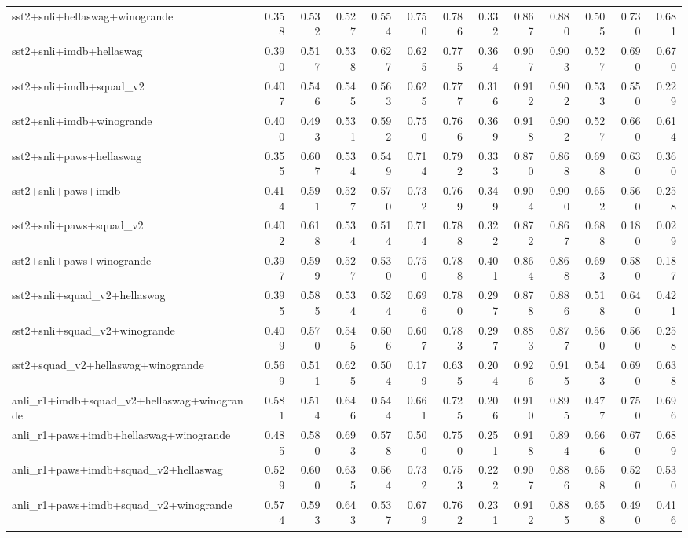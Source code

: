 \begin{table}[t]
\begin{tabular}{lrrrrrrrrrrrr}
    sst2+snli+hellaswag+winogrande & 0.358 & 0.532 & 0.527 & 0.554 & 0.750 & 0.786 & 0.332 & 0.867 & 0.880 & 0.505 & 0.730 & 0.681 \\
    sst2+snli+imdb+hellaswag & 0.390 & 0.517 & 0.538 & 0.627 & 0.625 & 0.775 & 0.364 & 0.907 & 0.903 & 0.527 & 0.690 & 0.670 \\
    sst2+snli+imdb+squad\_v2 & 0.407 & 0.546 & 0.545 & 0.563 & 0.625 & 0.777 & 0.316 & 0.912 & 0.902 & 0.533 & 0.550 & 0.229 \\
    sst2+snli+imdb+winogrande & 0.400 & 0.493 & 0.531 & 0.592 & 0.750 & 0.766 & 0.369 & 0.918 & 0.902 & 0.527 & 0.660 & 0.614 \\
    sst2+snli+paws+hellaswag & 0.355 & 0.607 & 0.534 & 0.549 & 0.714 & 0.792 & 0.333 & 0.870 & 0.868 & 0.698 & 0.630 & 0.360 \\
    sst2+snli+paws+imdb & 0.414 & 0.591 & 0.527 & 0.570 & 0.732 & 0.769 & 0.349 & 0.904 & 0.900 & 0.652 & 0.560 & 0.258 \\
    sst2+snli+paws+squad\_v2 & 0.402 & 0.618 & 0.534 & 0.514 & 0.714 & 0.788 & 0.322 & 0.872 & 0.867 & 0.688 & 0.180 & 0.029 \\
    sst2+snli+paws+winogrande & 0.397 & 0.599 & 0.527 & 0.530 & 0.750 & 0.788 & 0.401 & 0.864 & 0.868 & 0.693 & 0.580 & 0.187 \\
    sst2+snli+squad\_v2+hellaswag & 0.395 & 0.585 & 0.534 & 0.524 & 0.696 & 0.780 & 0.297 & 0.878 & 0.886 & 0.518 & 0.640 & 0.421 \\
    sst2+snli+squad\_v2+winogrande & 0.409 & 0.570 & 0.545 & 0.506 & 0.607 & 0.783 & 0.297 & 0.883 & 0.877 & 0.560 & 0.560 & 0.258 \\
    sst2+squad\_v2+hellaswag+winogrande & 0.569 & 0.511 & 0.625 & 0.504 & 0.179 & 0.635 & 0.204 & 0.926 & 0.915 & 0.543 & 0.690 & 0.638 \\
    \addlinespace
    anli\_r1+imdb+squad\_v2+hellaswag+winogrande & 0.581 & 0.514 & 0.646 & 0.544 & 0.661 & 0.725 & 0.206 & 0.910 & 0.895 & 0.477 & 0.750 & 0.696 \\
    anli\_r1+paws+imdb+hellaswag+winogrande & 0.485 & 0.580 & 0.693 & 0.578 & 0.500 & 0.750 & 0.251 & 0.918 & 0.894 & 0.666 & 0.670 & 0.689 \\
    anli\_r1+paws+imdb+squad\_v2+hellaswag & 0.529 & 0.600 & 0.635 & 0.564 & 0.732 & 0.753 & 0.222 & 0.907 & 0.886 & 0.658 & 0.520 & 0.530 \\
    anli\_r1+paws+imdb+squad\_v2+winogrande & 0.574 & 0.593 & 0.643 & 0.537 & 0.679 & 0.762 & 0.231 & 0.912 & 0.885 & 0.658 & 0.490 & 0.416 \\

\end{tabular}
\end{table}
